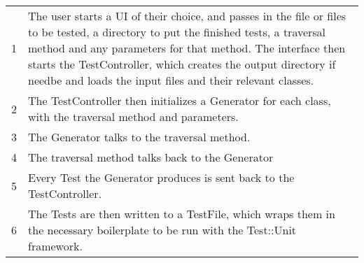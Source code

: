   \begin{tabular}{c  p{}}
  1 &
  The user starts a UI of their choice, and passes in the file or files to be tested, a directory to put the finished tests, a traversal method and any parameters for that method.
  The interface then starts the TestController, which creates the output directory if needbe and loads the input files and their relevant classes. \\
  2 &
  The TestController then initializes a Generator for each class, with the traversal method and parameters. \\
  3 &
  The Generator talks to the traversal method. \\
  4 &
  The traversal method talks back to the Generator \\
  5 &
  Every Test the Generator produces is sent back to the TestController. \\
  6 &
  The Tests are then written to a TestFile, which wraps them in the necessary boilerplate to be run with the Test::Unit framework.
  \\
  \end{tabular}


